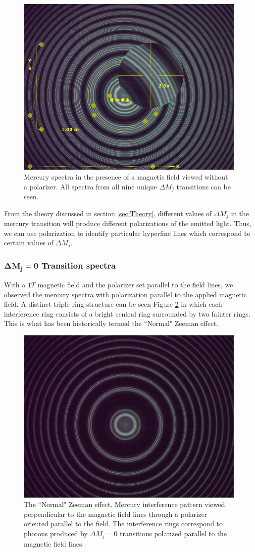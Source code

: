 \documentclass[twocolumn]{article}
\begin{document}
		\begin{figure}
			\centering
			\includegraphics[width=0.6\linewidth]{Images/Run2_NoPolarizer_detail}
			\caption{Mercury spectra in the presence of a magnetic field viewed without a polarizer. All spectra from all nine unique $\Delta M_j$ transitions can be seen.}
			\label{fig:Run2_NoPolarizer_detail}
		\end{figure}

		From the theory discussed in section \ref{sec:Theory}, different values of $\Delta M_j$ in the mercury transition will produce different polarizations of the emitted light.
		Thus, we can use polarization to identify particular hyperfine lines which correspond to certain values of $\Delta M_j$.
		
		\subsubsection{$\mathbf{\Delta M_j = 0}$ Transition spectra}
			With a $1T$ magnetic field and the polarizer set parallel to the field lines, we observed the mercury spectra with polarization parallel to the applied magnetic field. A distinct triple ring structure can be seen Figure \ref{fig:Triplet90deg} in which each interference ring consists of a bright central ring surrounded by two fainter rings. 
			This is what has been historically termed the ``Normal" Zeeman effect.
			
			\begin{figure}
				\centering
				\includegraphics[width=0.6\linewidth]{Images/Run1_ParallelPolarizer}
				\caption{The ``Normal" Zeeman effect. Mercury interference pattern viewed perpendicular to the magnetic field lines through a polarizer oriented parallel to the field. The interference rings correspond to photons produced by $\Delta M_j = 0$ transitions polarized parallel to the magnetic field lines.}
				\label{fig:Triplet90deg}
			\end{figure}
			
\end{document}
